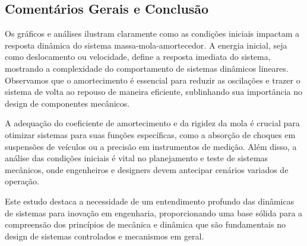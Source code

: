\subsection{Comentários Gerais e Conclusão}
Os gráficos e análises ilustram claramente como as condições iniciais impactam a resposta dinâmica do sistema massa-mola-amortecedor. A energia inicial, seja como deslocamento ou velocidade, define a resposta imediata do sistema, mostrando a complexidade do comportamento de sistemas dinâmicos lineares. Observamos que o amortecimento é essencial para reduzir as oscilações e trazer o sistema de volta ao repouso de maneira eficiente, sublinhando sua importância no design de componentes mecânicos.

A adequação do coeficiente de amortecimento e da rigidez da mola é crucial para otimizar sistemas para suas funções específicas, como a absorção de choques em suspensões de veículos ou a precisão em instrumentos de medição. Além disso, a análise das condições iniciais é vital no planejamento e teste de sistemas mecânicos, onde engenheiros e designers devem antecipar cenários variados de operação.

Este estudo destaca a necessidade de um entendimento profundo das dinâmicas de sistemas para inovação em engenharia, proporcionando uma base sólida para a compreensão dos princípios de mecânica e dinâmica que são fundamentais no design de sistemas controlados e mecanismos em geral.
